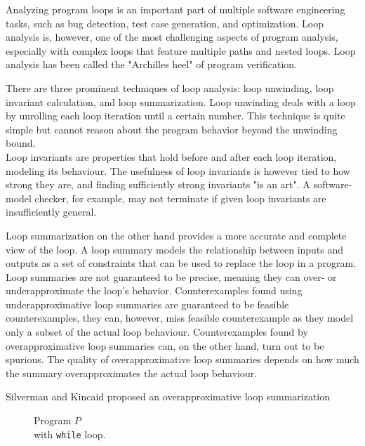 
Analyzing program loops is an important part of multiple software engineering tasks, such as bug detection, test case generation, and optimization. Loop analysis is, however, one of the most challenging aspects of program analysis, especially with complex loops that feature multiple paths and nested loops. Loop analysis has been called the "Archilles heel" of program verification\cite{0.1007/s10703-012-0176-y}. \par
There are three prominent techniques of loop analysis: loop unwinding, loop invariant calculation, and loop summarization\cite{0.1007/s10703-012-0176-y, 8241837,10.1007/978-3-030-25543-5_7}. Loop unwinding deals with a loop by unrolling each loop iteration until a certain number. This technique is quite simple but cannot reason about the program behavior beyond the unwinding bound. \\
Loop invariants are properties that hold before and after each loop iteration, modeling its behaviour. The usefulness of loop invariants is however tied to how strong they are, and finding sufficiently strong invariants "is an art"\cite{0.1007/s10703-012-0176-y}. A software-model checker, for example, may not terminate if given loop invariants are insufficiently general. \par
Loop summarization on the other hand provides a more accurate and complete view of the loop. A loop summary models the relationship between inputs and outputs as a set of constraints that can be used to replace the loop in a program. Loop summaries are not guaranteed to be precise, meaning they can over- or underapproximate the loop's behavior. Counterexamples found using underapproximative loop summaries are guaranteed to be feasible counterexamples, they can, however, miss feasible counterexample as they model only a subset of the actual loop behaviour. Counterexamples found by overapproximative loop summaries can, on the other hand, turn out to be spurious. The quality of overapproximative loop summaries depends on how much the summary overapproximates the actual loop behaviour.\par
{}
Silverman and Kincaid\cite{10.1007/978-3-030-25543-5_7} proposed an overapproximative loop summarization  \\
\begin{minipage}[t]{0.3\linewidth} \centering
	\begin{figure}[H]
		
		\caption{Program $P$ \\ with \texttt{while} loop.}
	\end{figure}
\end{minipage}
